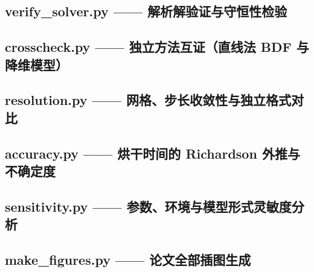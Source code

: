 \subsection{verify\_solver.py —— 解析解验证与守恒性检验}


\subsection{crosscheck.py —— 独立方法互证（直线法 BDF 与降维模型）}


\subsection{resolution.py —— 网格、步长收敛性与独立格式对比}


\subsection{accuracy.py —— 烘干时间的 Richardson 外推与不确定度}


\subsection{sensitivity.py —— 参数、环境与模型形式灵敏度分析}


\subsection{make\_figures.py —— 论文全部插图生成}

